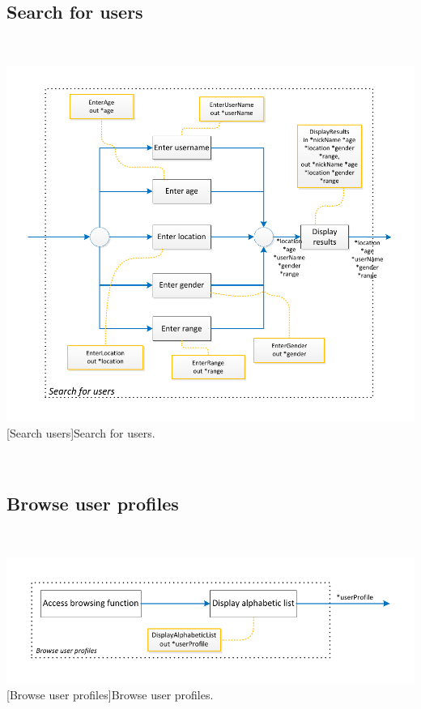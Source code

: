 \documentclass[11pt, a4paper,svglistings,oneside]{book}
\begin{document}
\subsection{Search for users}

$\;$ \\
\noindent\begin{minipage}{\textwidth}
    \centering
   \includegraphics[scale=1]{nav_SearchUsers.pdf}
 [Search users]{Search for users.}
\end{minipage}
$\;$ \\ 

\subsection{Browse user profiles}

$\;$ \\
\noindent\begin{minipage}{\textwidth}
    \centering
   \includegraphics[scale=1]{nav_BrowseUserProfile.pdf}
 [Browse user profiles]{Browse user profiles.}
\end{minipage}
$\;$ \\ 
\end{document}
